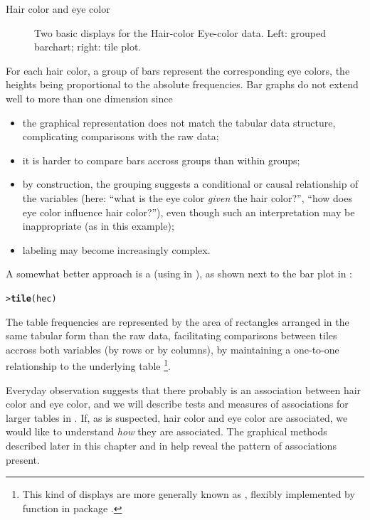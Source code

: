 \documentclass[10pt,krantz2]{krantz}\usepackage[]{graphicx}\usepackage[]{color}
\makeatletter
\newcommand{\hlstd}[1]{\textcolor[rgb]{0.345,0.345,0.345}{#1}}%
\newcommand{\hlkwd}[1]{\textcolor[rgb]{0.737,0.353,0.396}{\textbf{#1}}}%
\newenvironment{kframe}{%
 \def\at@end@of@kframe{}%
 \ifinner\ifhmode%
  \def\at@end@of@kframe{\end{minipage}}%
  \begin{minipage}{\columnwidth}%
 \fi\fi%
 \def\FrameCommand##1{\hskip\@totalleftmargin \hskip-\fboxsep
 \colorbox{shadecolor}{##1}\hskip-\fboxsep
     \hskip-\linewidth \hskip-\@totalleftmargin \hskip\columnwidth}%
 \MakeFramed {\advance\hsize-\width
   \@totalleftmargin\z@ \linewidth\hsize
   \@setminipage}}%
 {\par\unskip\endMakeFramed%
 \at@end@of@kframe}
\newenvironment{knitrout}{}{} %
\renewenvironment{knitrout}{\small\renewcommand{\baselinestretch}{.85}}{} %
\makeatother
\begin{document}
\begin{Example}[haireye1]{Hair color and eye color}
\begin{knitrout}
\begin{figure}[!htbp]
\caption[Two basic displays for the Hair-color Eye-color data]{Two basic displays for the Hair-color Eye-color data. Left: grouped barchart; right: tile plot.\label{fig:bartile}}
\end{figure}


\end{knitrout}
\noindent For each hair
color, a group of bars represent the corresponding eye colors, the
heights being proportional to the absolute frequencies. Bar graphs do
not extend well to more than one dimension since
\begin{itemize}
\item the graphical representation does not match the tabular data structure,
  complicating comparisons with the raw data;
\item it is harder to compare bars accross groups than within groups;
\item by construction, the grouping suggests a conditional
or causal relationship of the variables (here: ``what is the eye color
  \emph{given} the hair color?'', ``how does eye color influence hair color?''), even
  though such an interpretation may be inappropriate (as in this example);
\item labeling may become increasingly complex.
\end{itemize}
A somewhat better approach is a  (using  in ), as shown next to the bar
plot in :
\begin{knitrout}
\color{fgcolor}\begin{kframe}
\begin{alltt}
\hlstd{> }\hlkwd{tile}\hlstd{(hec)}
\end{alltt}
\end{kframe}
\end{knitrout}
\noindent The table frequencies are represented by the area of
rectangles arranged in the same tabular form than the raw data,
facilitating comparisons between tiles accross both variables (by rows
or by columns), by maintaining a one-to-one relationship to the
underlying table
\footnote{This kind of displays are more generally known as
 \citep{Hofmann:00}, 
flexibly implemented by function  in package .}.

Everyday observation suggests that there probably is an association
between hair color and eye color, and we will describe tests
and measures of associations for larger tables in
.
If, as is suspected, hair color and eye color are associated,
we would like to understand \emph{how} they are associated.
The graphical methods described later in this chapter
and in  help
reveal the pattern of associations present.
\end{Example}
\end{document}
